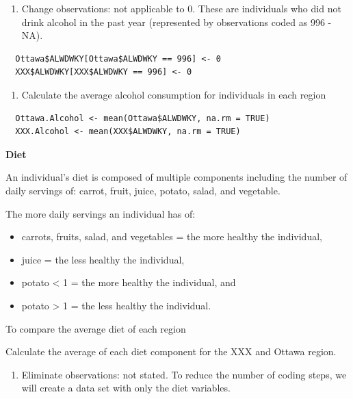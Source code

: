 \documentclass[]{book}
\providecommand{\tightlist}{%
  \setlength{\itemsep}{0pt}\setlength{\parskip}{0pt}}
\begin{document}
\begin{enumerate}
\def\labelenumi{\alph{enumi}.}
\setcounter{enumi}{1}
\tightlist
\item
  Change observations: not applicable to 0. These are individuals who
  did not drink alcohol in the past year (represented by observations
  coded as 996 - NA).
\end{enumerate}

\begin{verbatim}
  Ottawa$ALWDWKY[Ottawa$ALWDWKY == 996] <- 0
  XXX$ALWDWKY[XXX$ALWDWKY == 996] <- 0
\end{verbatim}

\begin{enumerate}
\def\labelenumi{\alph{enumi}.}
\setcounter{enumi}{2}
\tightlist
\item
  Calculate the average alcohol consumption for individuals in each
  region
\end{enumerate}

\begin{verbatim}
  Ottawa.Alcohol <- mean(Ottawa$ALWDWKY, na.rm = TRUE)
  XXX.Alcohol <- mean(XXX$ALWDWKY, na.rm = TRUE)
\end{verbatim}

\textbf{Diet}

An individual's diet is composed of multiple components including the
number of daily servings of: carrot, fruit, juice, potato, salad, and
vegetable.

The more daily servings an individual has of:

\begin{itemize}
\tightlist
\item
  carrots, fruits, salad, and vegetables = the more healthy the
  individual,
\item
  juice = the less healthy the individual,
\item
  potato \textless{} 1 = the more healthy the individual, and
\item
  potato \textgreater{} 1 = the less healthy the individual.
\end{itemize}

To compare the average diet of each region

Calculate the average of each diet component for the XXX and Ottawa
region.

\begin{enumerate}
\def\labelenumi{\alph{enumi}.}
\tightlist
\item
  Eliminate observations: not stated. To reduce the number of coding
  steps, we will create a data set with only the diet variables.
\end{enumerate}
\end{document}
